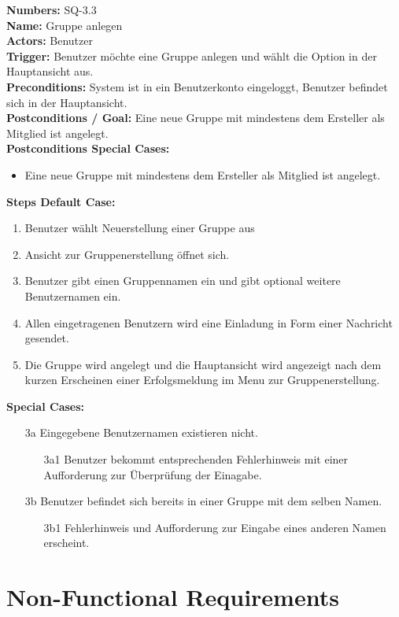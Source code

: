 \documentclass{article}
\begin{document}
\newpage
\vspace{0.5cm}

\begin{samepage}
\textbf{Numbers:} SQ-3.3\\
\textbf{Name:} Gruppe anlegen\\
\textbf{Actors:} Benutzer\\
\textbf{Trigger:} Benutzer möchte eine Gruppe anlegen und wählt die Option in der Hauptansicht aus.\\
\textbf{Preconditions:}  System ist in ein Benutzerkonto eingeloggt, Benutzer befindet sich in der Hauptansicht.\\
\textbf{Postconditions / Goal:} Eine neue Gruppe mit mindestens dem Ersteller als Mitglied ist angelegt.\\
\textbf{Postconditions Special Cases:} 
\begin{itemize}
    \item Eine neue Gruppe mit mindestens dem Ersteller als Mitglied ist angelegt. 
\end{itemize}
\textbf{Steps Default Case:}
\begin{enumerate}
    \item Benutzer wählt Neuerstellung einer Gruppe aus
    \item Ansicht zur Gruppenerstellung öffnet sich.
    \item Benutzer gibt einen Gruppennamen ein und gibt optional weitere Benutzernamen ein.
    \item Allen eingetragenen Benutzern wird eine Einladung in Form einer Nachricht gesendet.
    \item Die Gruppe wird angelegt und die Hauptansicht wird angezeigt nach dem kurzen Erscheinen einer Erfolgsmeldung im Menu zur Gruppenerstellung.
\end{enumerate}
\textbf{Special Cases:}
\begin{itemize}
    \item [3a] Eingegebene Benutzernamen existieren nicht.
    \begin{itemize}
        \item [3a1] Benutzer bekommt entsprechenden Fehlerhinweis mit einer Aufforderung zur Überprüfung der Einagabe.
    \end{itemize}
    \item [3b] Benutzer befindet sich bereits in einer Gruppe mit dem selben Namen. 
    \begin{itemize}
        \item [3b1] Fehlerhinweis und Aufforderung zur Eingabe eines anderen Namen erscheint. 
    \end{itemize}
\end{itemize}
\end{samepage}

\newpage
\section{Non-Functional Requirements}
\end{document}

